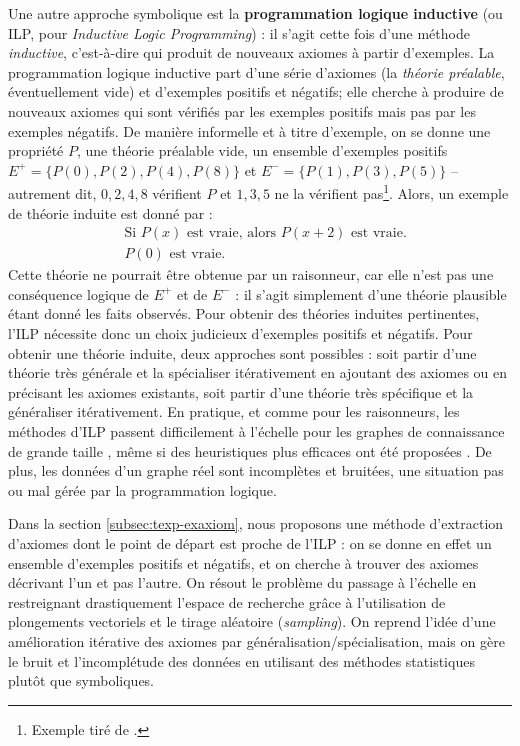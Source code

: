 Une autre approche symbolique est la \textbf{programmation logique inductive} (ou ILP, pour \textit{Inductive Logic Programming}) \cite{nienhuys1997foundations, de2008probabilistic}: il s'agit cette fois d'une méthode \textit{inductive}, c'est-à-dire qui produit de nouveaux axiomes à partir d'exemples. La programmation logique inductive part d'une série d'axiomes (la \textit{théorie préalable}, éventuellement vide) et d'exemples positifs et négatifs; elle cherche à produire de nouveaux axiomes qui sont vérifiés par les exemples positifs  mais pas par les exemples négatifs. De manière informelle et à titre d'exemple, on se donne une propriété $P$, une théorie préalable vide, un ensemble d'exemples positifs $E^+=\{P(0), P(2), P(4), P(8) \}$ et $E^- = \{ P(1), P(3), P(5) \}$ – autrement dit, $0, 2, 4, 8$ vérifient $P$ et $1, 3, 5$ ne la vérifient pas\footnote{Exemple tiré de \cite{nienhuys1997foundations}.}. Alors, un exemple de théorie induite est donné par :
\begin{align}
    & \textrm{Si } P(x) \textrm{ est vraie, alors } P(x + 2) \textrm{ est vraie.} \\
    & P(0) \textrm{ est vraie.}
\end{align}
Cette théorie ne pourrait être obtenue par un raisonneur, car elle n'est pas une conséquence logique de $E^+$ et de $E^-$ : il s'agit simplement d'une théorie plausible étant donné les faits observés. Pour obtenir des théories induites pertinentes, l'ILP nécessite donc un choix judicieux d'exemples positifs et négatifs.
Pour obtenir une théorie induite, deux approches sont possibles : soit partir d'une théorie très générale et la spécialiser itérativement en ajoutant des axiomes ou en précisant les axiomes existants, soit partir d'une théorie très spécifique et la généraliser itérativement.
En pratique, et comme pour les raisonneurs, les méthodes d'ILP passent difficilement à l'échelle pour les graphes de connaissance de grande taille \cite{srinivasan2012data}, même si des heuristiques plus efficaces ont été proposées \cite{zeng2014quickfoil}. De plus, les données d'un graphe réel sont incomplètes et bruitées, une situation pas ou mal gérée par la programmation logique. 

Dans la section \ref{subsec:texp-exaxiom}, nous proposons une méthode d'extraction d'axiomes dont le point de départ est proche de l'ILP : on se donne en effet un ensemble d'exemples positifs et négatifs, et on cherche à trouver des axiomes décrivant l'un et pas l'autre. On résout le problème du passage à l'échelle en restreignant drastiquement l'espace de recherche grâce à l'utilisation de plongements vectoriels et le tirage aléatoire (\textit{sampling}). On reprend l'idée d'une amélioration itérative des axiomes par généralisation/spécialisation, mais on gère le bruit et l'incomplétude des données en utilisant des méthodes statistiques plutôt que symboliques.

